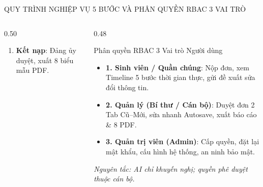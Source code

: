 \documentclass[aspectratio=169, 10pt]{beamer}
\begin{document}
\begin{frame}{QUY TRÌNH NGHIỆP VỤ 5 BƯỚC VÀ PHÂN QUYỀN RBAC 3 VAI TRÒ}
\begin{columns}[T]
\begin{column}{0.50\textwidth}
\begin{infoCard}
\begin{enumerate}
          \item \textbf{Kết nạp}: Đảng ủy duyệt, xuất 8 biểu mẫu PDF.
        \end{enumerate}
      \end{infoCard}
    \end{column}
    \begin{column}{0.48\textwidth}
      \begin{highlightCard}{Phân quyền RBAC 3 Vai trò Người dùng}
        \fontsize{6.8pt}{8.5pt}\selectfont
        \begin{itemize}
          \setlength{\itemsep}{1.5pt}
          \item \textbf{1. Sinh viên / Quần chúng}: Nộp đơn, xem Timeline 5 bước thời gian thực, gửi đề xuất sửa đổi thông tin.
          \item \textbf{2. Quản lý (Bí thư / Cán bộ)}: Duyệt đơn 2 Tab Cũ--Mới, sửa nhanh Autosave, xuất báo cáo \& 8 PDF.
          \item \textbf{3. Quản trị viên (Admin)}: Cấp quyền, đặt lại mật khẩu, cấu hình hệ thống, an ninh bảo mật.
        \end{itemize}
        \textit{\color{gray} Nguyên tắc: AI chỉ khuyến nghị; quyền phê duyệt thuộc cán bộ.}
      \end{highlightCard}
    \end{column}
  \end{columns}
\end{frame}
\end{document}
